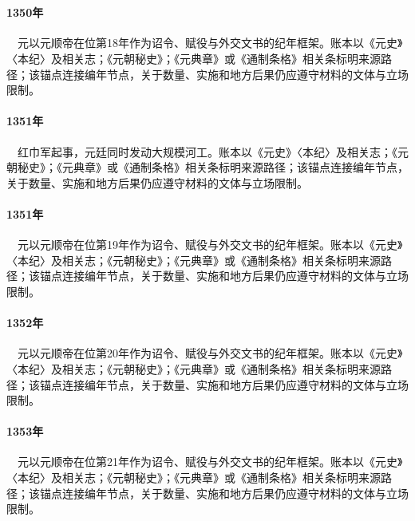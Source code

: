 \section{}

\paragraph{1350年}　元以元顺帝在位第18年作为诏令、赋役与外交文书的纪年框架。账本以《元史》〈本纪〉及相关志；《元朝秘史》；《元典章》或《通制条格》相关条标明来源路径；该锚点连接编年节点，关于数量、实施和地方后果仍应遵守材料的文体与立场限制。

\paragraph{1351年}　红巾军起事，元廷同时发动大规模河工。账本以《元史》〈本纪〉及相关志；《元朝秘史》；《元典章》或《通制条格》相关条标明来源路径；该锚点连接编年节点，关于数量、实施和地方后果仍应遵守材料的文体与立场限制。

\paragraph{1351年}　元以元顺帝在位第19年作为诏令、赋役与外交文书的纪年框架。账本以《元史》〈本纪〉及相关志；《元朝秘史》；《元典章》或《通制条格》相关条标明来源路径；该锚点连接编年节点，关于数量、实施和地方后果仍应遵守材料的文体与立场限制。

\paragraph{1352年}　元以元顺帝在位第20年作为诏令、赋役与外交文书的纪年框架。账本以《元史》〈本纪〉及相关志；《元朝秘史》；《元典章》或《通制条格》相关条标明来源路径；该锚点连接编年节点，关于数量、实施和地方后果仍应遵守材料的文体与立场限制。

\paragraph{1353年}　元以元顺帝在位第21年作为诏令、赋役与外交文书的纪年框架。账本以《元史》〈本纪〉及相关志；《元朝秘史》；《元典章》或《通制条格》相关条标明来源路径；该锚点连接编年节点，关于数量、实施和地方后果仍应遵守材料的文体与立场限制。

